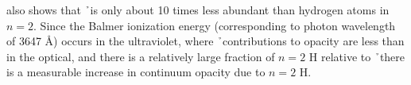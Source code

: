 \cite{boehm1989} also shows that \h\ is only about 10 times less abundant than hydrogen atoms in $n=2$.  Since the Balmer ionization energy (corresponding to photon wavelength of 3647 \AA) occurs in the ultraviolet, where \h\ contributions to opacity are less than in the optical, and there is a relatively large fraction of $n=2$ H relative to \h\ there is a measurable increase in continuum opacity due to $n=2$ H.  %

